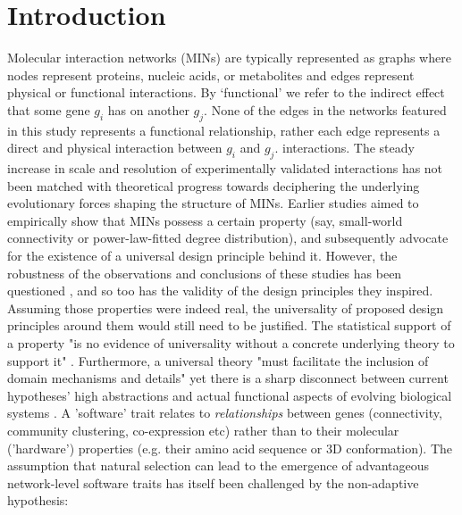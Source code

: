\section{Introduction}
        Molecular interaction networks (MINs) are typically represented as graphs where nodes represent proteins, nucleic acids, or metabolites and edges represent physical or functional interactions. By `functional' we refer to the indirect effect that some gene $g_i$ has on another $g_j$. None of the edges in the networks featured in this study represents a functional relationship, rather each edge represents a direct and physical interaction between  $g_i$ and  $g_j$.
        interactions. The steady increase in scale \cite{rolland_proteome-scale_2014} and resolution \cite{yang_widespread_2016} of experimentally validated interactions has not been matched with theoretical progress towards deciphering the underlying evolutionary forces shaping the structure of MINs. Earlier studies aimed to empirically show that MINs possess a certain property (say, small-world connectivity or power-law-fitted degree distribution), and subsequently advocate for the existence of a universal design principle behind it. However, the robustness of the observations and conclusions of these studies \cite{barabasi_emergence_1999, fell_small_2000} has been questioned \cite{arita_metabolic_2004, tanaka_protein_2005, fox_keller_revisiting_2005, khanin_how_2006}, and so too \cite{stelling_robustness_2004, hahn_molecular_2004} %
        has the validity of the design principles \cite{albert_error_2000, barabasi_network_2004} they inspired. Assuming those properties were indeed real, the universality of proposed design principles around them would still need to be justified. The statistical support of a property "is no evidence of universality without a concrete underlying theory to support it" \cite{stumpf_critical_2012}. Furthermore, a universal theory "must facilitate the inclusion of domain mechanisms and details" yet there is a sharp disconnect between current hypotheses' high abstractions and actual functional aspects of evolving biological systems \cite{alderson_contrasting_2010}.
        A 'software' trait relates to \textit{relationships} between genes (connectivity, community clustering, co-expression etc) rather than to their molecular ('hardware') properties (e.g. their amino acid sequence or 3D conformation).
        The assumption that natural selection can lead to the emergence of advantageous network-level software traits has itself been challenged by the non-adaptive hypothesis: %
